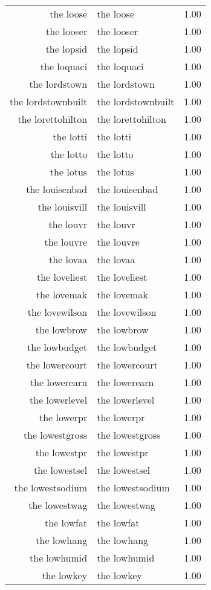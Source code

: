 \begin{table}[ht]
\begin{tabular}{rlr}
  the loose & the loose & 1.00 \\ 
  the looser & the looser & 1.00 \\ 
  the lopsid & the lopsid & 1.00 \\ 
  the loquaci & the loquaci & 1.00 \\ 
  the lordstown & the lordstown & 1.00 \\ 
  the lordstownbuilt & the lordstownbuilt & 1.00 \\ 
  the lorettohilton & the lorettohilton & 1.00 \\ 
  the lotti & the lotti & 1.00 \\ 
  the lotto & the lotto & 1.00 \\ 
  the lotus & the lotus & 1.00 \\ 
  the louisenbad & the louisenbad & 1.00 \\ 
  the louisvill & the louisvill & 1.00 \\ 
  the louvr & the louvr & 1.00 \\ 
  the louvre & the louvre & 1.00 \\ 
  the lovaa & the lovaa & 1.00 \\ 
  the loveliest & the loveliest & 1.00 \\ 
  the lovemak & the lovemak & 1.00 \\ 
  the lovewilson & the lovewilson & 1.00 \\ 
  the lowbrow & the lowbrow & 1.00 \\ 
  the lowbudget & the lowbudget & 1.00 \\ 
  the lowercourt & the lowercourt & 1.00 \\ 
  the lowerearn & the lowerearn & 1.00 \\ 
  the lowerlevel & the lowerlevel & 1.00 \\ 
  the lowerpr & the lowerpr & 1.00 \\ 
  the lowestgross & the lowestgross & 1.00 \\ 
  the lowestpr & the lowestpr & 1.00 \\ 
  the lowestsel & the lowestsel & 1.00 \\ 
  the lowestsodium & the lowestsodium & 1.00 \\ 
  the lowestwag & the lowestwag & 1.00 \\ 
  the lowfat & the lowfat & 1.00 \\ 
  the lowhang & the lowhang & 1.00 \\ 
  the lowhumid & the lowhumid & 1.00 \\ 
  the lowkey & the lowkey & 1.00 \\ 

\end{tabular}
\end{table}
